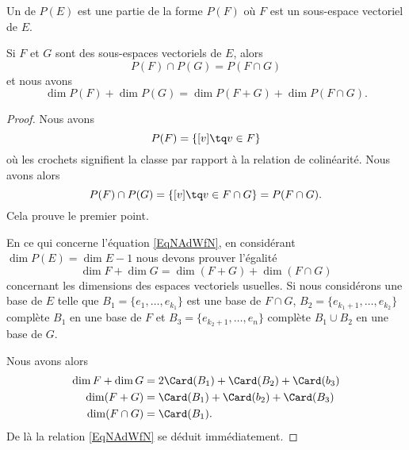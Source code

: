 Un  de \( P(E)\) est une partie de la forme \( P(F)\) où \( F\) est un sous-espace vectoriel de \( E\).

\begin{proposition}     \label{PropuqpWVx}
    Si \( F\) et \( G\) sont des sous-espaces vectoriels de \( E\), alors
    \begin{equation}
        P(F)\cap P(G)=P(F\cap G)
    \end{equation}
    et nous avons
    \begin{equation}        \label{EqNAdWfN}
        \dim P(F)+\dim P(G)=\dim P(F+G)+\dim P(F\cap G).
    \end{equation}
\end{proposition}

\begin{proof}
    Nous avons 
    \begin{equation}
        P(F)=\{ [v]\tq v\in F \}
    \end{equation}
    où les crochets signifient la classe par rapport à la relation de colinéarité. Nous avons alors
    \begin{equation}
        P(F)\cap P(G)=\{ [v]\tq v\in F\cap G \}=P(F\cap G).
    \end{equation}
    Cela prouve le premier point.

    En ce qui concerne l'équation \eqref{EqNAdWfN}, en considérant \( \dim P(E)=\dim E-1\) nous devons prouver l'égalité
    \begin{equation}
        \dim F+\dim G=\dim (F+G)+\dim(F\cap G)
    \end{equation}
    concernant les dimensions des espaces vectoriels usuelles. Si nous considérons une base de \( E\) telle que \( B_1=\{ e_1,\ldots, e_{k_1} \}\) est une base de \( F\cap G\), \( B_2=\{ e_{k_1+1},\ldots, e_{k_2} \}\) complète \( B_1\) en une base de \( F\) et \( B_3=\{ e_{k_2+1},\ldots, e_n \}\) complète \( B_1\cup B_2\) en une base de \( G\).

    Nous avons alors
    \begin{subequations}
        \begin{align}
            \dim F+\dim G&=2\Card(B_1)+\Card(B_2)+\Card(b_3)\\
            \dim(F+G)&=\Card(B_1)+\Card(b_2)+\Card(B_3)\\
            \dim(F\cap G)&=\Card(B_1).
        \end{align}
    \end{subequations}
    De là la relation \eqref{EqNAdWfN} se déduit immédiatement.    
\end{proof}

